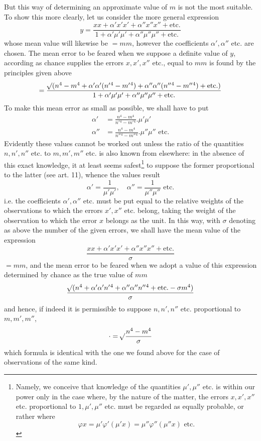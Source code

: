 But this way of determining an approximate value of \(m\) is not the most suitable. To show this more clearly, let us consider the more general expression
\[
y=\frac{xx+\alpha'x'x'+\alpha''x''x''+\text{etc.}}{1+\alpha'\mu'\mu'+\alpha''\mu''\mu''+\text{etc.}}
\]
whose mean value will likewise be \(=mm\), however the coefficients \(\alpha',\alpha''\) etc. are chosen. The mean error to be feared when we suppose a definite value of \(y\), according as chance supplies the errors \(x,x',x''\) etc., equal to \(mm\) is found by the principles given above
\[
=\frac{\mathord{{}^{}\!\surd}(n^4-m^4+\alpha'\alpha'(n'{}^4-m'{}^4)+\alpha''\alpha''(n''{}^4-m''{}^4)+\text{etc.})}{1+\alpha'\mu'\mu'+\alpha''\mu''\mu''+\text{etc.}}
\]
To make this mean error as small as possible, we shall have to put
\[
\begin{aligned}
\alpha'&=\frac{n^4-m^4}{n'{}^4-m'{}^4}.\mu'\mu'\\[4pt]
\alpha''&=\frac{n^4-m^4}{n''{}^4-m''{}^4}.\mu''\mu''\text{ etc.}
\end{aligned}
\]
Evidently these values cannot be worked out unless the ratio of the quantities \(n,n',n''\) etc. to \(m,m',m''\) etc. is also known from elsewhere: in the absence of this exact knowledge, it at least seems safest\footnote{Namely, we conceive that knowledge of the quantities \(\mu',\mu''\) etc. is within our power only in the case where, by the nature of the matter, the errors \(x,x',x''\) etc. proportional to \(1,\mu',\mu''\) etc. must be regarded as equally probable, or rather where
\[
\varphi x=\mu'\varphi'(\mu'x)=\mu''\varphi''(\mu''x)\text{ etc.}
\]
} to suppose the former proportional to the latter (see art. 11), whence the values result
\[
\alpha'=\frac1{\mu'\mu'},\quad\alpha''=\frac1{\mu''\mu''}\text{ etc.}
\]
i.e. the coefficients \(\alpha',\alpha''\) etc. must be put equal to the relative weights of the observations to which the errors \(x',x''\) etc. belong, taking the weight of the observation to which the error \(x\) belongs as the unit. In this way, with \(\sigma\) denoting as above the number of the given errors, we shall have the mean value of the expression
\[
\frac{xx+\alpha'x'x'+\alpha''x''x''+\text{etc.}}{\sigma}
\]
\(=mm\), and the mean error to be feared when we adopt a value of this expression determined by chance as the true value of \(mm\)
\[
\frac{\mathord{{}^{}\!\surd}(n^4+\alpha'\alpha'n'{}^4+\alpha''\alpha''n''{}^4+\text{etc.}-\sigma m^4)}{\sigma}
\]
and hence, if indeed it is permissible to suppose \(n,n',n''\) etc. proportional to \(m,m',m''\),
\[
\mathord{\cdot}=\mathord{{}^{}\!\surd}\frac{n^4-m^4}{\sigma}
\]
which formula is identical with the one we found above for the case of observations of the same kind.

